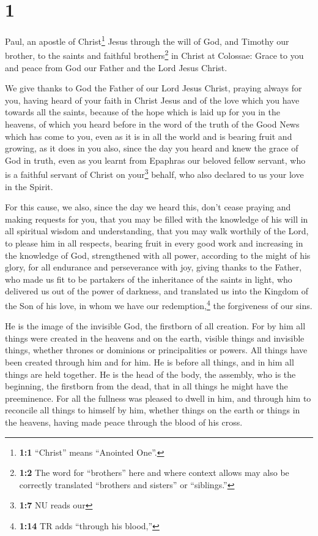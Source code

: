 \hypertarget{section}{%
\section{1}\label{section}}

 Paul, an apostle of Christ\footnote{\textbf{1:1}
  ``Christ'' means ``Anointed One''.} Jesus through the will of God, and
Timothy our brother,  to the saints and faithful
brothers\footnote{\textbf{1:2} The word for ``brothers'' here and where
  context allows may also be correctly translated ``brothers and
  sisters'' or ``siblings.''} in Christ at Colossae: Grace to you and
peace from God our Father and the Lord Jesus Christ.

 We give thanks to God the Father of our Lord Jesus
Christ, praying always for you,  having heard of your
faith in Christ Jesus and of the love which you have towards all the
saints,  because of the hope which is laid up for you in
the heavens, of which you heard before in the word of the truth of the
Good News  which has come to you, even as it is in all the
world and is bearing fruit and growing, as it does in you also, since
the day you heard and knew the grace of God in truth, 
even as you learnt from Epaphras our beloved fellow servant, who is a
faithful servant of Christ on your\footnote{\textbf{1:7} NU reads our}
behalf,  who also declared to us your love in the Spirit.

 For this cause, we also, since the day we heard this,
don't cease praying and making requests for you, that you may be filled
with the knowledge of his will in all spiritual wisdom and
understanding,  that you may walk worthily of the Lord,
to please him in all respects, bearing fruit in every good work and
increasing in the knowledge of God,  strengthened with
all power, according to the might of his glory, for all endurance and
perseverance with joy,  giving thanks to the Father, who
made us fit to be partakers of the inheritance of the saints in light,
 who delivered us out of the power of darkness, and
translated us into the Kingdom of the Son of his love, 
in whom we have our redemption,\footnote{\textbf{1:14} TR adds ``through
  his blood,''} the forgiveness of our sins.

 He is the image of the invisible God, the firstborn of
all creation.  For by him all things were created in the
heavens and on the earth, visible things and invisible things, whether
thrones or dominions or principalities or powers. All things have been
created through him and for him.  He is before all
things, and in him all things are held together.  He is
the head of the body, the assembly, who is the beginning, the firstborn
from the dead, that in all things he might have the preeminence.
 For all the fullness was pleased to dwell in him,
 and through him to reconcile all things to himself by
him, whether things on the earth or things in the heavens, having made
peace through the blood of his cross.

